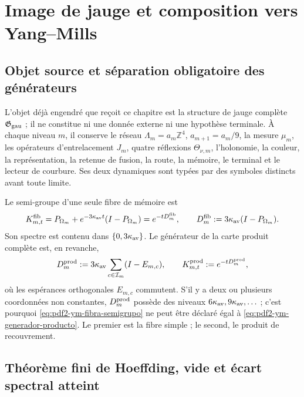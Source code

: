 \chapter{Image de jauge et composition vers Yang--Mills}

\section{Objet source et séparation obligatoire des générateurs}

L’objet déjà engendré que reçoit ce chapitre est la structure de jauge complète
$\mathfrak G_{\rm gau}$ ; il ne constitue ni une donnée externe ni une hypothèse terminale.
À chaque niveau $m$, il conserve le réseau
$\Lambda_m=a_m\mathbb Z^4$, $a_{m+1}=a_m/9$, la mesure $\mu_m$, les
opérateurs d’entrelacement $J_m$, quatre réflexions $\Theta_{\nu,m}$, l’holonomie, la couleur,
la représentation, la retenue de fusion, la route, la mémoire, le terminal et le lecteur de courbure.
Ses deux dynamiques sont typées par des symboles distincts avant toute limite.

Le semi-groupe d’une seule fibre de mémoire est
\begin{equation}\label{eq:pdf2-ym-fibra-semigrupo}
 K^{\rm fib}_{m,t}
 =P_{\Omega_m}+e^{-3\kappa_{\rm av}t}(I-P_{\Omega_m})
 =e^{-tD_m^{\rm fib}},
 \qquad
 D_m^{\rm fib}:=3\kappa_{\rm av}(I-P_{\Omega_m}).
\end{equation}
Son spectre est contenu dans $\{0,3\kappa_{\rm av}\}$. Le générateur de la carte produit complète est, en revanche,
\begin{equation}\label{eq:pdf2-ym-generador-producto}
 D_m^{\rm prod}:=3\kappa_{\rm av}
 \sum_{c\in\mathcal I_m}(I-E_{m,c}),
 \qquad
 K^{\rm prod}_{m,t}:=e^{-tD_m^{\rm prod}},
\end{equation}
où les espérances orthogonales $E_{m,c}$ commutent. S’il y a deux ou plusieurs
coordonnées non constantes, $D_m^{\rm prod}$ possède des niveaux
$6\kappa_{\rm av},9\kappa_{\rm av},\ldots$ ; c’est pourquoi
\eqref{eq:pdf2-ym-fibra-semigrupo} ne peut être déclaré égal à
\eqref{eq:pdf2-ym-generador-producto}. Le premier est la fibre simple ; le second,
le produit de recouvrement.

\section{Théorème fini de Hoeffding, vide et écart spectral atteint}

